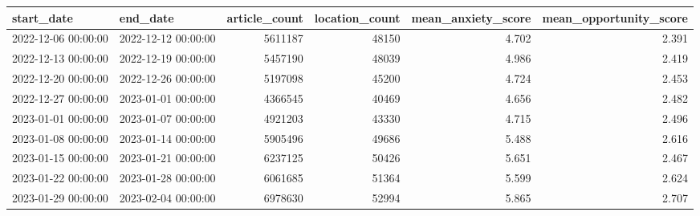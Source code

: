 \begin{tabular}{llrrrr}
\toprule
start\_date & end\_date & article\_count & location\_count & mean\_anxiety\_score & mean\_opportunity\_score \\
\midrule
2022-12-06 00:00:00 & 2022-12-12 00:00:00 & 5611187 & 48150 & 4.702 & 2.391 \\
2022-12-13 00:00:00 & 2022-12-19 00:00:00 & 5457190 & 48039 & 4.986 & 2.419 \\
2022-12-20 00:00:00 & 2022-12-26 00:00:00 & 5197098 & 45200 & 4.724 & 2.453 \\
2022-12-27 00:00:00 & 2023-01-01 00:00:00 & 4366545 & 40469 & 4.656 & 2.482 \\
2023-01-01 00:00:00 & 2023-01-07 00:00:00 & 4921203 & 43330 & 4.715 & 2.496 \\
2023-01-08 00:00:00 & 2023-01-14 00:00:00 & 5905496 & 49686 & 5.488 & 2.616 \\
2023-01-15 00:00:00 & 2023-01-21 00:00:00 & 6237125 & 50426 & 5.651 & 2.467 \\
2023-01-22 00:00:00 & 2023-01-28 00:00:00 & 6061685 & 51364 & 5.599 & 2.624 \\
2023-01-29 00:00:00 & 2023-02-04 00:00:00 & 6978630 & 52994 & 5.865 & 2.707 \\
\bottomrule
\end{tabular}
